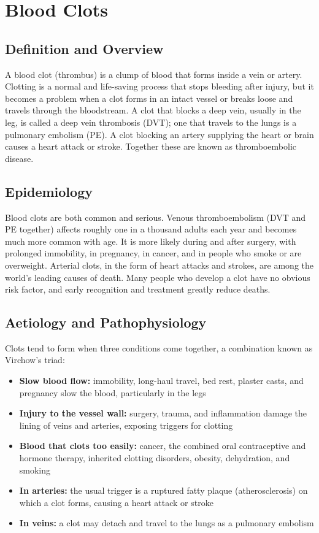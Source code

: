 \chapter{Blood Clots}

\section*{Definition and Overview}
A blood clot (thrombus) is a clump of blood that forms inside a vein or artery. Clotting is a normal and life-saving process that stops bleeding after injury, but it becomes a problem when a clot forms in an intact vessel or breaks loose and travels through the bloodstream. A clot that blocks a deep vein, usually in the leg, is called a deep vein thrombosis (DVT); one that travels to the lungs is a pulmonary embolism (PE). A clot blocking an artery supplying the heart or brain causes a heart attack or stroke. Together these are known as thromboembolic disease.

\section*{Epidemiology}
Blood clots are both common and serious. Venous thromboembolism (DVT and PE together) affects roughly one in a thousand adults each year and becomes much more common with age. It is more likely during and after surgery, with prolonged immobility, in pregnancy, in cancer, and in people who smoke or are overweight. Arterial clots, in the form of heart attacks and strokes, are among the world's leading causes of death. Many people who develop a clot have no obvious risk factor, and early recognition and treatment greatly reduce deaths.

\section*{Aetiology and Pathophysiology}
Clots tend to form when three conditions come together, a combination known as Virchow's triad:

\begin{itemize}
    \item \textbf{Slow blood flow:} immobility, long-haul travel, bed rest, plaster casts, and pregnancy slow the blood, particularly in the legs
    \item \textbf{Injury to the vessel wall:} surgery, trauma, and inflammation damage the lining of veins and arteries, exposing triggers for clotting
    \item \textbf{Blood that clots too easily:} cancer, the combined oral contraceptive and hormone therapy, inherited clotting disorders, obesity, dehydration, and smoking
    \item \textbf{In arteries:} the usual trigger is a ruptured fatty plaque (atherosclerosis) on which a clot forms, causing a heart attack or stroke
    \item \textbf{In veins:} a clot may detach and travel to the lungs as a pulmonary embolism
\end{itemize}

